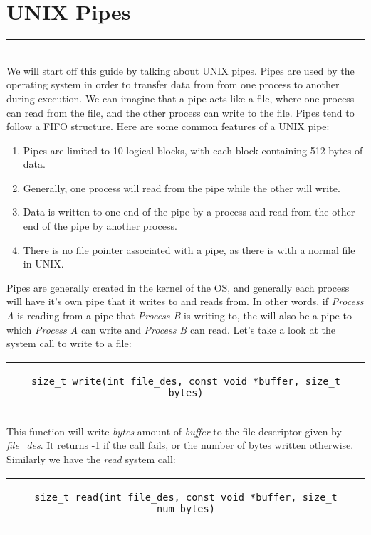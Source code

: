 \documentclass{article}
\begin{document}
\section{UNIX Pipes}
\hrule
\noindent\\
\indent We will start off this guide by talking about UNIX pipes. Pipes are used by the operating system in order to transfer data from from one process to another during execution. We can imagine that a pipe acts like a file, where one process can read from the file, and the other process can write to the file. Pipes tend to follow a FIFO structure. Here are some common features of a UNIX pipe:
\begin{enumerate}
\item Pipes are limited to 10 logical blocks, with each block containing 512 bytes of data.
\item Generally, one process will read from the pipe while the other will write.
\item Data is written to one end of the pipe by a process and read from the other end of the pipe by another process.
\item There is no file pointer associated with a pipe, as there is with a normal file in UNIX.
\end{enumerate}
\indent Pipes are generally created in the kernel of the OS, and generally each process will have it's own pipe that it writes to and reads from. In other words, if \textit{Process A} is reading from a pipe that \textit{Process B} is writing to, the will also be a pipe to which \textit{Process A} can write and \textit{Process B} can read. Let's take a look at the system call to write to a file:
\begin{center} 
\begin{tabular}{c}
\begin{lstlisting}
size_t write(int file_des, const void *buffer, size_t bytes)
\end{lstlisting}
\end{tabular}
\end{center}
\indent This function will write \textit{bytes} amount of \textit{buffer} to the file descriptor given by \textit{file\_des}. It returns -1 if the call fails, or the number of bytes written otherwise. Similarly we have the \textit{read} system call:
\begin{center} 
\begin{tabular}{c}
\begin{lstlisting}
size_t read(int file_des, const void *buffer, size_t  num_bytes)
\end{lstlisting}
\end{tabular}
\end{center}
\end{document}
